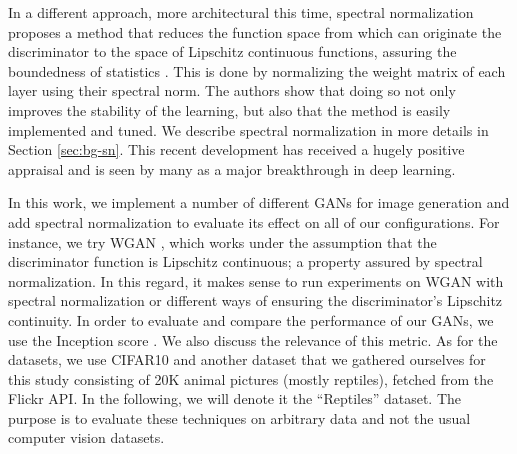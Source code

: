 In a different approach, more architectural this time, spectral normalization proposes a method that reduces the function space from which can originate the discriminator to the space of Lipschitz continuous functions, assuring the boundedness of statistics . This is done by normalizing the weight matrix of each layer using their spectral norm. The authors show that doing so not only improves the stability of the learning, but also that the method is easily implemented and tuned. We describe spectral normalization in more details in Section \ref{sec:bg-sn}. This recent development has received a hugely positive appraisal and is seen by many as a major breakthrough in deep learning.

In this work, we implement a number of different GANs for image generation and add spectral normalization \cite{miyato2018spectral} to evaluate its effect on all of our configurations. For instance, we try WGAN \cite{arjovsky2017wasserstein}, which works under the assumption that the discriminator function is Lipschitz continuous; a property assured by spectral normalization. In this regard, it makes sense to run experiments on WGAN with spectral normalization or different ways of ensuring the discriminator's Lipschitz continuity. In order to evaluate and compare the performance of our GANs, we use the Inception score \cite{salimans2016improved}. We also discuss the relevance of this metric. As for the datasets, we use CIFAR10 \cite{cifar10} and another dataset that we gathered ourselves for this study consisting of 20K animal pictures (mostly reptiles), fetched from the Flickr API. In the following, we will denote it the ``Reptiles'' dataset. The purpose is to evaluate these techniques on arbitrary data and not the usual computer vision datasets. 


